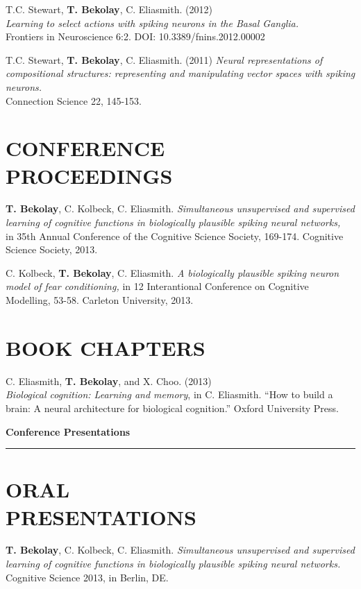 \documentclass[line,margin]{res}
\begin{document}
\begin{resume}
T.C. Stewart, \textbf{T. Bekolay}, C. Eliasmith. (2012) \\
  {\sl Learning to select actions with spiking neurons in the
  Basal Ganglia.} \\
  Frontiers in Neuroscience 6:2. DOI: 10.3389/fnins.2012.00002

T.C. Stewart, \textbf{T. Bekolay}, C. Eliasmith. (2011)
  {\sl Neural representations of compositional structures:
  representing and manipulating vector spaces with spiking neurons.} \\
  Connection Science 22, 145-153.

\section{CONFERENCE \\PROCEEDINGS}

\textbf{T. Bekolay}, C. Kolbeck, C. Eliasmith. {\sl Simultaneous
  unsupervised and supervised learning of cognitive functions
  in biologically plausible spiking neural networks,} \\ in 35th Annual
  Conference of the Cognitive Science Society, 169-174.
  Cognitive Science Society, 2013.

C. Kolbeck, \textbf{T. Bekolay}, C. Eliasmith. {\sl A biologically
  plausible spiking neuron model of fear conditioning,} in 12 Interantional
  Conference on Cognitive Modelling, 53-58.
  Carleton University, 2013.

\section{BOOK CHAPTERS}

C. Eliasmith, \textbf{T. Bekolay}, and X. Choo. (2013) \\
  {\sl Biological cognition: Learning and memory}, in C. Eliasmith.
  ``How to build a brain: A neural architecture for biological cognition.''
  Oxford University Press. \vspace{0.42em}

{\Large \bf Conference Presentations} \\ \vspace{-8pt} \hrule

\section{ORAL \\PRESENTATIONS}

\textbf{T. Bekolay}, C. Kolbeck, C. Eliasmith.
  {\sl Simultaneous unsupervised and supervised learning of cognitive
  functions in biologically plausible spiking neural networks.}
  Cognitive Science 2013, in Berlin, DE.


\end{resume}
\end{document}
